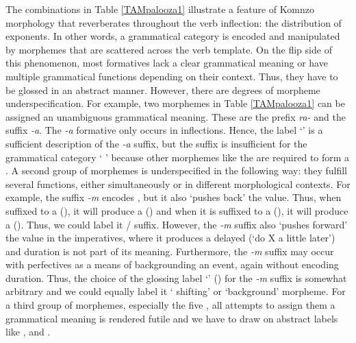 The combinations in Table \ref{TAMpalooza1} illustrate a feature of Komnzo morphology that reverberates throughout the verb inflection: the distribution of exponents. In other words, a grammatical category is encoded and manipulated by morphemes that are scattered across the verb template. On the flip side of this phenomenon, most formatives lack a clear grammatical meaning or have multiple grammatical functions depending on their context. Thus, they have to be glossed in an abstract manner. However, there are degrees of morpheme underspecification. For example, two morphemes in Table \ref{TAMpalooza1} can be assigned an unambiguous grammatical meaning. These are the  prefix \emph{ra-} and the  suffix \emph{-a}. The \emph{-a} formative only occurs in   inflections. Hence, the label `' is a sufficient description of the \emph{-a} suffix, but the suffix is insufficient for the grammatical category ` ' because other morphemes like the  are required to form a  . A second group of morphemes is underspecified in the following way: they fulfill several functions, either simultaneously or in different morphological contexts. For example, the  suffix \emph{-m} encodes  , but it also `pushes back' the  value. Thus, when suffixed to a  (), it will produce a  () and when it is suffixed to a  (), it will produce a  (). Thus, we could label it / suffix. However, the \emph{-m} suffix also `pushes forward' the  value in the imperatives, where it produces a delayed  (`do X a little later') and duration is not part of its meaning. Furthermore, the \emph{-m} suffix may occur with perfectives as a means of backgrounding an event, again without encoding duration. Thus, the choice of the glossing label `' (\Dur) for the \emph{-m} suffix is somewhat arbitrary and we could equally label it ` shifting' or `background' morpheme. For a third group of morphemes, especially the five , all attempts to assign them a grammatical meaning is rendered futile and we have to draw on abstract labels like \Alph{}, \Bet{} and \Gam{}.%

